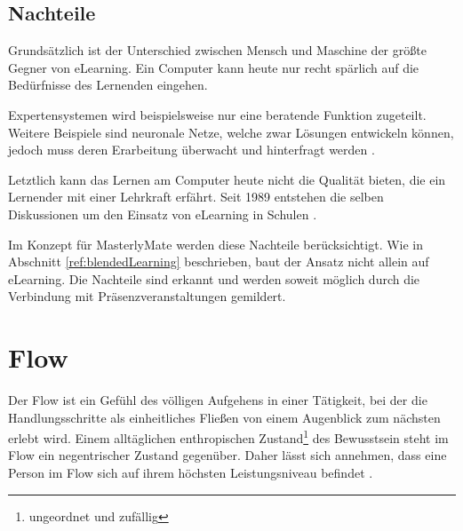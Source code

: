 \subsection{Nachteile}  
Grundsätzlich ist der Unterschied zwischen Mensch und Maschine der größte
Gegner von eLearning. Ein Computer kann heute nur recht spärlich auf die
Bedürfnisse des Lernenden eingehen. 

Expertensystemen wird beispielsweise nur eine beratende Funktion zugeteilt.
Weitere Beispiele sind neuronale Netze, welche zwar Lösungen entwickeln können,
jedoch muss deren Erarbeitung überwacht und hinterfragt werden
\cite{keller:2000}.

Letztlich kann das Lernen am Computer heute nicht die Qualität bieten, die ein
Lernender mit einer Lehrkraft erfährt. Seit 1989 entstehen die selben
Diskussionen um den Einsatz von eLearning in Schulen \cite{thome:1989}.

Im Konzept für MasterlyMate werden diese Nachteile berücksichtigt. Wie in
Abschnitt \ref{ref:blendedLearning} beschrieben, baut der Ansatz nicht allein
auf eLearning. Die Nachteile sind erkannt und werden soweit möglich durch die
Verbindung mit Präsenzveranstaltungen gemildert.

\section{Flow}\label{ref:basFlow}
Der Flow ist ein Gefühl des völligen Aufgehens in einer Tätigkeit, bei der
die Handlungsschritte als einheitliches Fließen von einem Augenblick zum
nächsten erlebt wird. Einem alltäglichen enthropischen
Zustand\footnote{ungeordnet und zufällig} des Bewusstsein steht im Flow ein
negentrischer Zustand gegenüber. Daher lässt sich annehmen, dass eine Person im
Flow sich auf ihrem höchsten Leistungsniveau befindet
\cite{csikszentmihalyi:1993}.
 
